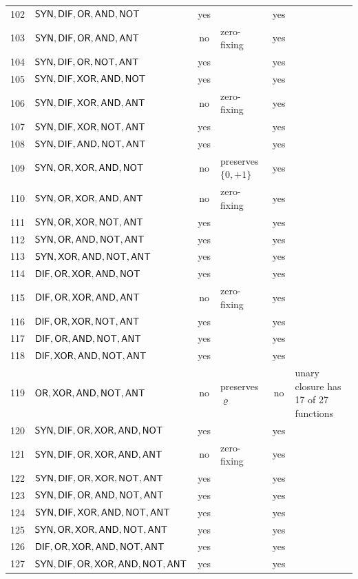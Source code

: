 \documentclass[10pt,a4paper]{article}
\begin{document}
\begin{center}
\begin{longtable}{rlcp{3.9cm}cp{3.9cm}}
102&$\SYN, \DIF, \OR, \AND, \NOT$&yes&&yes&\\
103&$\SYN, \DIF, \OR, \AND, \ANT$&no&zero-fixing&yes&\\
104&$\SYN, \DIF, \OR, \NOT, \ANT$&yes&&yes&\\
105&$\SYN, \DIF, \XOR, \AND, \NOT$&yes&&yes&\\
106&$\SYN, \DIF, \XOR, \AND, \ANT$&no&zero-fixing&yes&\\
107&$\SYN, \DIF, \XOR, \NOT, \ANT$&yes&&yes&\\
108&$\SYN, \DIF, \AND, \NOT, \ANT$&yes&&yes&\\
109&$\SYN, \OR, \XOR, \AND, \NOT$&no&preserves $\{0,+1\}$&yes&\\
110&$\SYN, \OR, \XOR, \AND, \ANT$&no&zero-fixing&yes&\\
111&$\SYN, \OR, \XOR, \NOT, \ANT$&yes&&yes&\\
112&$\SYN, \OR, \AND, \NOT, \ANT$&yes&&yes&\\
113&$\SYN, \XOR, \AND, \NOT, \ANT$&yes&&yes&\\
114&$\DIF, \OR, \XOR, \AND, \NOT$&yes&&yes&\\
115&$\DIF, \OR, \XOR, \AND, \ANT$&no&zero-fixing&yes&\\
116&$\DIF, \OR, \XOR, \NOT, \ANT$&yes&&yes&\\
117&$\DIF, \OR, \AND, \NOT, \ANT$&yes&&yes&\\
118&$\DIF, \XOR, \AND, \NOT, \ANT$&yes&&yes&\\
119&$\OR, \XOR, \AND, \NOT, \ANT$&no&preserves $\varrho$&no&unary closure has 17 of 27 functions\\
120&$\SYN, \DIF, \OR, \XOR, \AND, \NOT$&yes&&yes&\\
121&$\SYN, \DIF, \OR, \XOR, \AND, \ANT$&no&zero-fixing&yes&\\
122&$\SYN, \DIF, \OR, \XOR, \NOT, \ANT$&yes&&yes&\\
123&$\SYN, \DIF, \OR, \AND, \NOT, \ANT$&yes&&yes&\\
124&$\SYN, \DIF, \XOR, \AND, \NOT, \ANT$&yes&&yes&\\
125&$\SYN, \OR, \XOR, \AND, \NOT, \ANT$&yes&&yes&\\
126&$\DIF, \OR, \XOR, \AND, \NOT, \ANT$&yes&&yes&\\
127&$\SYN, \DIF, \OR, \XOR, \AND, \NOT, \ANT$&yes&&yes&\\
\bottomrule\end{longtable}\end{center}
\end{document}
